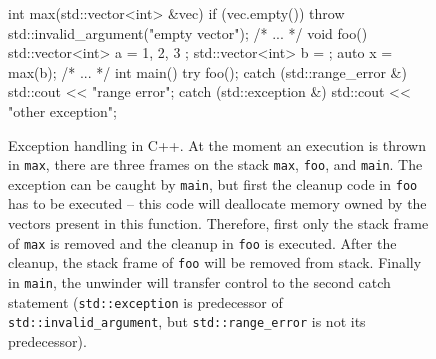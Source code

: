 \begin{figure}[t]
  \begin{cppcode}
    int max(std::vector<int> &vec) {
        if (vec.empty())
            throw std::invalid_argument("empty vector");
        /* ... */
    }
    void foo() {
        std::vector<int> a = { 1, 2, 3 };
        std::vector<int> b = {};
        auto x = max(b);
        /* ... */
    }
    int main() {
        try {
            foo();
        } catch (std::range_error &) {
            std::cout << "range error\n";
        } catch (std::exception &) {
            std::cout << "other exception\n";
        }
    }
  \end{cppcode}
  \vspace{-\bigskipamount}
\caption{Exception handling in C++.
  At the moment an execution is thrown in \texttt{max}, there are three frames
  on the stack \texttt{max}, \texttt{foo}, and \texttt{main}.
  The exception can be caught by \texttt{main}, but first the cleanup code
  in \texttt{foo} has to be executed -- this code will deallocate memory owned
  by the vectors present in this function.
  Therefore, first only the stack frame of \texttt{max} is removed and the
  cleanup in \texttt{foo} is executed.
  After the cleanup, the stack frame of \texttt{foo} will be removed from
  stack.
  Finally in \texttt{main}, the unwinder will transfer control to the second
  catch statement (\texttt{std::exception} is predecessor of \texttt{std::invalid\_argument}, but \texttt{std::range\_error} is not its predecessor).
}\label{fig:lang:exceptcpp}
\end{figure}

